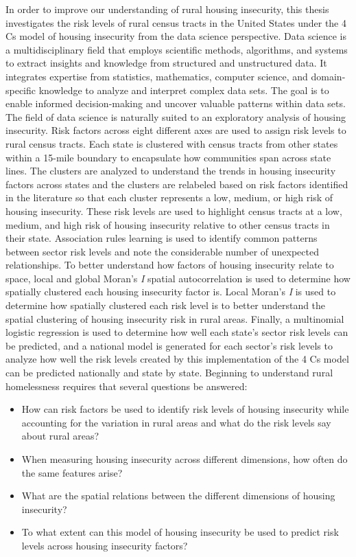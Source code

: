 
In order to improve our understanding of rural housing insecurity, this thesis investigates the risk levels of rural census tracts in the United States under the 4 Cs model of housing insecurity from the data science perspective. Data science is a multidisciplinary field that employs scientific methods, algorithms, and systems to extract insights and knowledge from structured and unstructured data. It integrates expertise from statistics, mathematics, computer science, and domain-specific knowledge to analyze and interpret complex data sets. The goal is to enable informed decision-making and uncover valuable patterns within data sets. The field of data science is naturally suited to an exploratory analysis of housing insecurity. Risk factors across eight different axes are used to assign risk levels to rural census tracts. Each state is clustered with census tracts from other states within a 15-mile boundary to encapsulate how communities span across state lines. The clusters are analyzed to understand the trends in housing insecurity factors across states and the clusters are relabeled based on risk factors identified in the literature so that each cluster represents a low, medium, or high risk of housing insecurity. These risk levels are used to highlight census tracts at a low, medium, and high risk of housing insecurity relative to other census tracts in their state. Association rules learning is used to identify common patterns between sector risk levels and note the considerable number of unexpected relationships. To better understand how factors of housing insecurity relate to space, local and global Moran's \textit{I} spatial autocorrelation is used to determine how spatially clustered each housing insecurity factor is. Local Moran's \textit{I} is used to determine how spatially clustered each risk level is to better understand the spatial clustering of housing insecurity risk in rural areas. Finally, a multinomial logistic regression is used to determine how well each state's sector risk levels can be predicted, and a national model is generated for each sector's risk levels to analyze how well the risk levels created by this implementation of the 4 Cs model can be predicted nationally and state by state. Beginning to understand rural homelessness requires that several questions be answered:
    \begin{itemize}
      \item How can risk factors be used to identify risk levels of housing insecurity while accounting for the variation in rural areas and what do the risk levels say about rural areas?
      \item When measuring housing insecurity across different dimensions, how often do the same features arise?
      \item What are the spatial relations between the different dimensions of housing insecurity?
      \item To what extent can this model of housing insecurity be used to predict risk levels across housing insecurity factors?
    \end{itemize}

